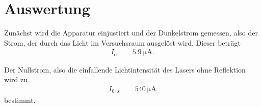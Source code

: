 \section{Auswertung}
\label{sec:Auswertung}

Zunächst wird die Apparatur einjustiert und der Dunkelstrom gemessen, also der Strom, der durch das Licht im Versuchsraum ausgelöst wird.
Dieser beträgt
\begin{align*}
  I_{\text{d}}&=\qty{5.9}{\micro\ampere}.
\end{align*}

Der Nullstrom, also die einfallende Lichtintensität des Lasers ohne Reflektion wird zu
\begin{align*}
  I_{\text{0, s}}&=\qty{540}{\micro\ampere}
\end{align*}
bestimmt.

